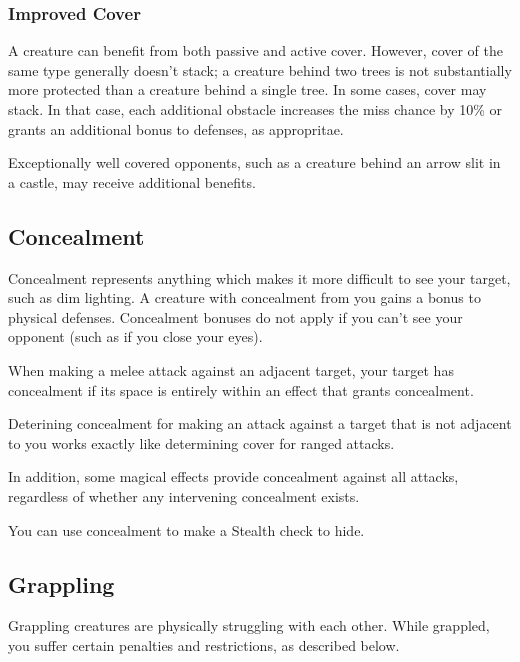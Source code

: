         \subsubsection{Improved Cover}

            A creature can benefit from both passive and active cover. However, cover of the same type generally doesn't stack; a creature behind two trees is not substantially more protected than a creature behind a single tree. In some cases, cover may stack. In that case, each additional obstacle increases the miss chance by 10\% or grants an additional  bonus to defenses, as appropritae.

            Exceptionally well covered opponents, such as a creature behind an arrow slit in a castle, may receive additional benefits.

    \subsection{Concealment}\label{Concealment}
        Concealment represents anything which makes it more difficult to see your target, such as dim lighting. A creature with concealment from you gains a  bonus to physical defenses. Concealment bonuses do not apply if you can't see your opponent (such as if you close your eyes).

         When making a melee attack against an adjacent target, your target has concealment if its space is entirely within an effect that grants concealment.

        Deterining concealment for making an attack against a target that is not adjacent to you works exactly like determining cover for ranged attacks.

        In addition, some magical effects provide concealment against all attacks, regardless of whether any intervening concealment exists.

         You can use concealment to make a Stealth check to hide.

    \subsection{Grappling}\label{Grappling}
        Grappling creatures are physically struggling with each other. While grappled, you suffer certain penalties and restrictions, as described below.

